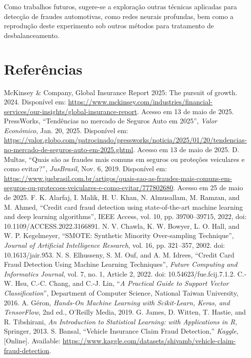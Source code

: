 \documentclass[conference]{IEEEtran}
\begin{document}
Como trabalhos futuros, sugere-se a exploração outras técnicas aplicadas para detecção de fraudes automotivas, como redes neurais profundas, bem como a reprodução deste experimento sob outros métodos para tratamento de desbalanceamento.

\section*{Referências}

\begin{thebibliography}{00}
 McKinsey \& Company, Global Insurance Report 2025: The pursuit of growth. 2024. Disponível em: \url{https://www.mckinsey.com/industries/financial-services/our-insights/global-insurance-report}. Acesso em 13 de maio de 2025.
 PressWorks,  ``Tendências no mercado de Seguros Auto em 2025'', \textit{Valor Econômico}, Jan. 20, 2025. Disponível em: \url{https://valor.globo.com/patrocinado/pressworks/noticia/2025/01/20/tendencias-no-mercado-de-seguros-auto-em-2025.ghtml}. Acesso em 13 de maio de 2025.
 D. Multas,  ``Quais são as fraudes mais comuns em seguros ou proteções veiculares e como evitar?'', \textit{JusBrasil}, Nov. 6, 2019. Disponível em: \url{https://www.jusbrasil.com.br/artigos/quais-sao-as-fraudes-mais-comuns-em-seguros-ou-protecoes-veiculares-e-como-evitar/777802680}. Acesso em 25 de maio de 2025.
 F. K. Alarfaj, I. Malik, H. U. Khan, N. Almusallam, M. Ramzan, and M. Ahmed, ``Credit card fraud detection using state-of-the-art machine learning and deep learning algorithms'', IEEE Access, vol. 10, pp. 39700–39715, 2022, doi: 10.1109/ACCESS.2022.3166891.
 N. V. Chawla, K. W. Bowyer, L. O. Hall, and W. P. Kegelmeyer, ``SMOTE: Synthetic Minority Over-sampling Technique'', \textit{Journal of Artificial Intelligence Research}, vol. 16, pp. 321–357, 2002. doi: 10.1613/jair.953. 
 N. S. Elhusseny, S. M. Ouf, and A. M. Idrees, ``Credit Card Fraud Detection Using Machine Learning Techniques'', \textit{Future Computing and Informatics Journal}, vol. 7, no. 1, Article 2, 2022. doi: 10.54623/fue.fcij.7.1.2. 
C.-W. Hsu, C.-C. Chang, and C.-J. Lin, ``\textit{{A Practical Guide to Support Vector Classification}}'', Department of Computer Science, National Taiwan University, 2016. 
A. Géron, \textit{Hands-On Machine Learning with Scikit-Learn, Keras, and TensorFlow}, 2nd ed., O’Reilly Media, 2019.
G. James, D. Witten, T. Hastie, and R. Tibshirani, \textit{An Introduction to Statistical Learning: with Applications in R}, Springer, 2013.
S. Bansal, “Vehicle Insurance Claim Fraud Detection,” \textit{Kaggle}, [Online]. Available: \url{https://www.kaggle.com/datasets/shivamb/vehicle-claim-fraud-detection}.
\end{thebibliography}
\vspace{12pt}
\end{document}
